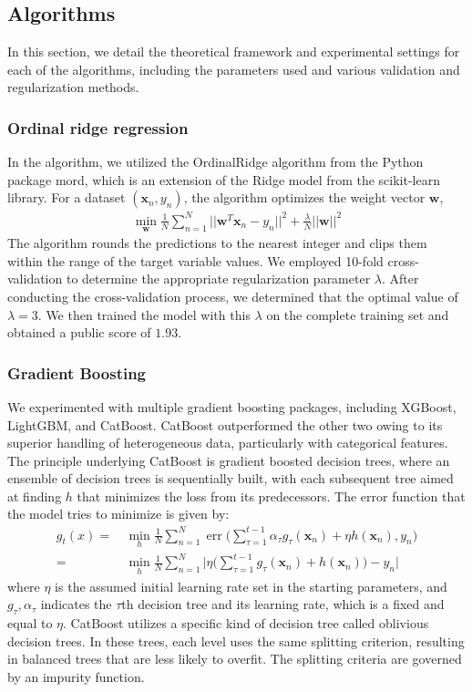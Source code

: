 \documentclass{article}
\begin{document}
\subsection{Algorithms}
In this section, we detail the theoretical framework and experimental settings for each of the algorithms, including the parameters used and various validation and regularization methods.  
\subsubsection{Ordinal ridge regression}
In the algorithm, we utilized the OrdinalRidge algorithm from the Python package mord, which is an extension of the Ridge model from the scikit-learn library. For a dataset $(\mathbf{x}_n, y_n)$, the algorithm optimizes the weight vector $\mathbf{w}$,
\begin{align}
\min_{\mathbf{w}} \frac{1}{N}\sum_{n=1}^N||\mathbf{w}^T\mathbf{x}_n-y_n||^2+\frac{\lambda}{N}||\mathbf{w}||^2
\end{align}
The algorithm rounds the predictions to the nearest integer and clips them within the range of the target variable values. We employed 10-fold cross-validation to determine the appropriate regularization parameter $\lambda$. After conducting the cross-validation process, we determined that the optimal value of $\lambda=3$. We then trained the model with this $\lambda$ on the complete training set and obtained a public score of $1.93$.

\subsubsection{Gradient Boosting}
We experimented with multiple gradient boosting packages, including XGBoost\cite{xgboost}, LightGBM\cite{lightgbm}, and CatBoost\cite{catboost}. CatBoost outperformed the other two owing to its superior handling of heterogeneous data, particularly with categorical features. The principle underlying CatBoost is gradient boosted decision trees, where an ensemble of decision trees is sequentially built, with each subsequent tree aimed at finding $h$ that minimizes the loss from its predecessors. The error function that the model tries to minimize is given by:
\begin{align}
g_t(x) =&\, \min_{h}\frac{1}{N}\sum_{n=1}^N\operatorname{err}\bigg(\sum_{\tau=1}^{t-1}\alpha_\tau g_\tau(\mathbf{x}_n)+\eta h(\mathbf{x}_n), y_n\bigg)\\
=&\,\min_{h}\frac{1}{N}\sum_{n=1}^N\bigg|\eta\bigg(\sum_{\tau=1}^{t-1}g_\tau(\mathbf{x}_n)+  h(\mathbf{x}_n)\bigg)- y_n\bigg|
\end{align}
where $\eta$ is the assumed initial learning rate set in the starting parameters, and $g_\tau, \alpha_\tau$ indicates the $\tau$th decision tree and its learning rate, which is a fixed and equal to $\eta$. 
CatBoost utilizes a specific kind of decision tree called oblivious decision trees\cite{catboost}. In these trees, each level uses the same splitting criterion, resulting in balanced trees that are less likely to overfit. The splitting criteria are governed by an impurity function.\\
\end{document}
